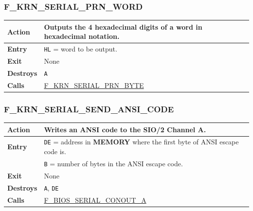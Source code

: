 \documentclass[a4paper,11pt]{article}
\begin{document}
        \subsubsection{F\_KRN\_SERIAL\_PRN\_WORD}
        \label{func:fkrnserialprnword}
        \begin{tabular}{l p{9cm}}
            \hline\textbf{Action}
            & Outputs the 4 hexadecimal digits of a word in hexadecimal notation.\\
            \hline\textbf{Entry}
            & \texttt{HL} = word to be output.\\
            \hline\textbf{Exit} & None \\
            \hline\textbf{Destroys} & \texttt{A} \\
            \hline\textbf{Calls}
            & \hyperref[func:fkrnserialprnbyte]{F\_KRN\_SERIAL\_PRN\_BYTE}\\
            \hline
        \end{tabular}

        \subsubsection{F\_KRN\_SERIAL\_SEND\_ANSI\_CODE}
        \label{func:fkrnserialsendansicode}
        \begin{tabular}{l p{9cm}}
            \hline\textbf{Action}
            & Writes an ANSI code to the \textbf{SIO/2} Channel A. \\
            \hline\textbf{Entry}
            & \texttt{DE} = address in \textbf{MEMORY} where the first byte of
            ANSI escape code is.\\
            & \texttt{B} = number of bytes in the ANSI escape code.\\
            \hline\textbf{Exit} & None \\
            \hline\textbf{Destroys} & \texttt{A}, \texttt{DE} \\
            \hline\textbf{Calls}
            & \hyperref[func:fbiosserialconouta]{F\_BIOS\_SERIAL\_CONOUT\_A}\\
            \hline
        \end{tabular}

\end{document}
